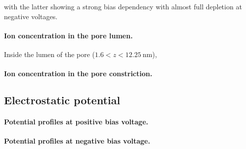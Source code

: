 \documentclass[journal=ancac3, manuscript=article, etalmode=truncate,maxauthors=0]{achemso}
\begin{document}
with the latter showing a strong bias dependency 
with almost full depletion at negative voltages.
\paragraph{Ion concentration in the pore lumen.}
Inside the lumen of the pore ($1.6<z<\SI{12.25}{\nm}$), 
\paragraph{Ion concentration in the pore constriction.}




%

\subsection{Electrostatic potential}

\paragraph{Potential profiles at positive bias voltage.}
\paragraph{Potential profiles at negative bias voltage.}
\end{document}
